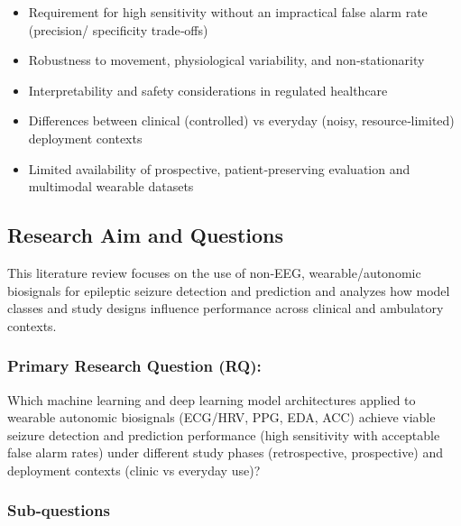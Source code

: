 \begin{itemize}
    \item Requirement for high sensitivity without an impractical false alarm rate (precision/ specificity trade‑offs)

    \item Robustness to movement, physiological variability, and non‑stationarity

    \item Interpretability and safety considerations in regulated healthcare

    \item Differences between clinical (controlled) vs everyday (noisy, resource‑limited)
    deployment contexts

    \item Limited availability of prospective, patient‑preserving evaluation and multimodal
    wearable datasets
\end{itemize}

\subsection{Research Aim and Questions}

This literature review focuses on the use of non‑EEG, wearable/autonomic biosignals for epileptic
seizure detection and prediction and analyzes how model classes and study designs
influence performance across clinical and ambulatory contexts.

\vspace{1em}

\subsubsection{Primary Research Question (RQ):}

Which machine learning and deep learning model architectures applied to wearable autonomic
biosignals (ECG/HRV, PPG, EDA, ACC) achieve viable seizure detection and prediction performance (high sensitivity with acceptable false alarm rates)
under different study phases (retrospective, prospective) and deployment contexts
(clinic vs everyday use)?

\subsubsection{Sub‑questions}

